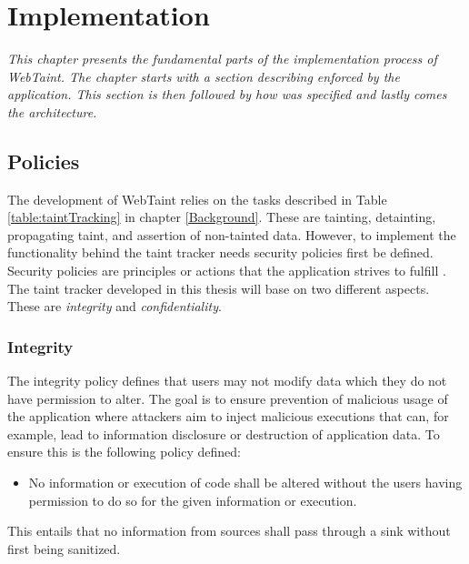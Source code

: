 \chapter{Implementation}
\label{Implementation}
\textit{This chapter presents the fundamental parts of the implementation process of WebTaint. The chapter starts with a section describing \textit{} enforced by the application. This section is then followed by how \textit{} was specified and lastly comes the \textit{} architecture.}



\section{Policies}
\label{Policies}
The development of WebTaint relies on the tasks described in Table \ref{table:taintTracking} in chapter \ref{Background}. These are tainting, detainting, propagating taint, and assertion of non-tainted data. However, to implement the functionality behind the taint tracker needs security policies first be defined. Security policies are principles or actions that the application strives to fulfill \parencite{BayukJenniferL2012Cspg}. The taint tracker developed in this thesis will base on two different aspects. These are \textit{integrity} and \textit{confidentiality}.



\subsection{Integrity}
\label{Integrity}
The integrity policy defines that users may not modify data which they do not have permission to alter. The goal is to ensure prevention of malicious usage of the application where attackers aim to inject malicious executions that can, for example, lead to information disclosure or destruction of application data. To ensure this is the following policy defined:

\hfill
\begin{itemize}
    \item No information or execution of code shall be altered without the users having permission to do so for the given information or execution.
\end{itemize}
\hfill

This entails that no information from sources shall pass through a sink without first being sanitized.



